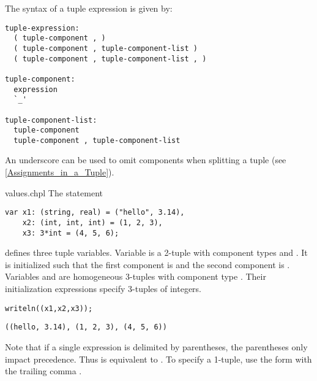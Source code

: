 The syntax of a tuple expression is given by:
\begin{syntax}
\begin{verbatim}
tuple-expression:
  ( tuple-component , )
  ( tuple-component , tuple-component-list )
  ( tuple-component , tuple-component-list , )

tuple-component:
  expression
  `_'

tuple-component-list:
  tuple-component
  tuple-component , tuple-component-list
\end{verbatim}
\end{syntax}

An underscore can be used to omit components when splitting
a tuple (see \ref{Assignments_in_a_Tuple}).

\begin{chapelexample}{values.chpl}
The statement
\begin{chapel}
\begin{verbatim}
var x1: (string, real) = ("hello", 3.14),
    x2: (int, int, int) = (1, 2, 3),
    x3: 3*int = (4, 5, 6);
\end{verbatim}
\end{chapel}
defines three tuple variables.  Variable  is a 2-tuple with
component types  and .  It is initialized such
that the first component is  and the second
component is .  Variables  and  are
homogeneous 3-tuples with component type .  Their
initialization expressions specify 3-tuples of integers.
\begin{chapelpost}
\begin{verbatim}
writeln((x1,x2,x3));
\end{verbatim}
\end{chapelpost}
\begin{chapeloutput}
\begin{verbatim}
((hello, 3.14), (1, 2, 3), (4, 5, 6))
\end{verbatim}
\end{chapeloutput}
\end{chapelexample}

Note that if a single expression is delimited by parentheses, the
parentheses only impact precedence.  Thus  is equivalent
to .  To specify a 1-tuple, use the form with the trailing
comma .

